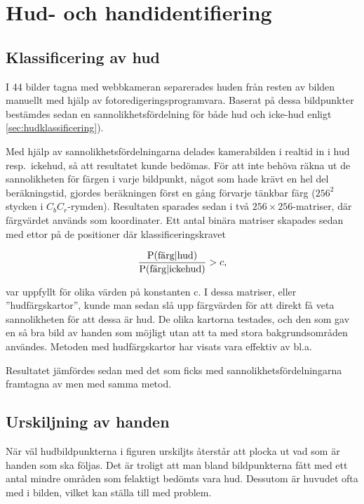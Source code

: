 \section{Hud- och handidentifiering}

\subsection{Klassificering av hud}
I 44 bilder tagna med webbkameran separerades huden från resten av
bilden manuellt med hjälp av fotoredigeringsprogramvara. Baserat på
dessa bildpunkter bestämdes sedan en sannolikhetsfördelning för både hud
och icke-hud enligt \ref{sec:hudklassificering}). 

Med hjälp av
sannolikhetsfördelningarna delades kamerabilden i realtid in i hud
resp.~ickehud, så att resultatet kunde bedömas. För att inte behöva
räkna ut de sannolikheten för färgen i varje bildpunkt,
något som hade krävt en hel del beräkningstid, gjordes beräkningen
först en gång förvarje tänkbar färg ($256^2$ stycken i
$C_bC_r$-rymden). Resultaten sparades
sedan i två $256\times256$-matriser, där färgvärdet används som
koordinater. Ett antal binära matriser skapades sedan med ettor på de
positioner där klassificeringskravet 

\begin{equation*}
	\frac{\mathrm{P}(\textrm{färg}|\textrm{hud})}{\mathrm{P}(\textrm{färg}|\textrm{ickehud})} > c,
\end{equation*}

var uppfyllt för olika värden på konstanten c. I dessa matriser, eller
''hudfärgskartor'', kunde man sedan slå upp
färgvärden för att direkt få veta sannolikheten för att dessa är
hud. De olika kartorna testades, och den som gav en så bra bild av
handen som möjligt utan att ta med stora bakgrundsområden användes.
Metoden med hudfärgskartor har visats vara effektiv av bl.a.~


Resultatet jämfördes sedan med det som ficks med
sannolikhetsfördelningarna framtagna av  men
med samma metod.

\subsection{Urskiljning av handen}\label{sec:metod_hud:urskiljning}

När väl hudbildpunkterna i figuren urskiljts återstår att plocka ut
vad som är handen som ska följas. Det är troligt att man bland
bildpunkterna fått med ett antal mindre områden som felaktigt bedömts vara
hud. Dessutom är huvudet ofta med i bilden, vilket kan ställa till med
problem. 


